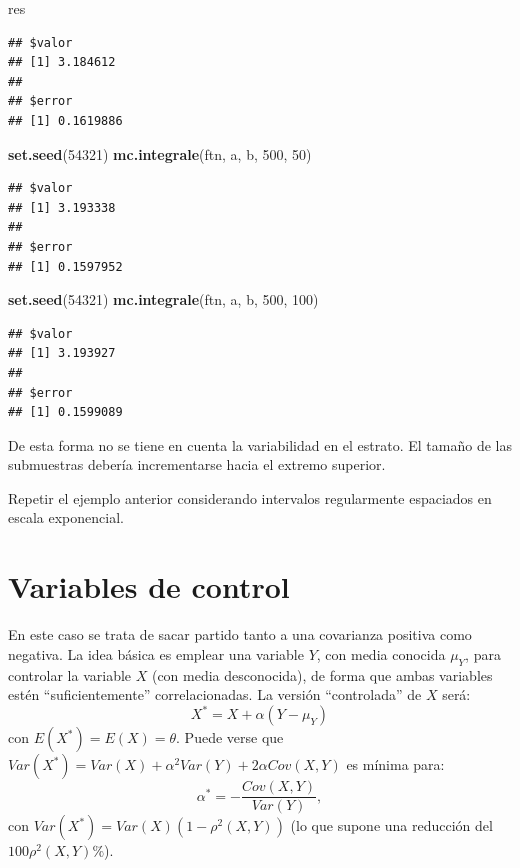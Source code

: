 \documentclass[
]{book}
\newenvironment{Shaded}{\begin{snugshade}}{\end{snugshade}}
\newcommand{\DecValTok}[1]{\textcolor[rgb]{0.00,0.00,0.81}{#1}}
\newcommand{\KeywordTok}[1]{\textcolor[rgb]{0.13,0.29,0.53}{\textbf{#1}}}
\newcommand{\NormalTok}[1]{#1}
\theoremstyle{break}
\theoremstyle{definition}
\theoremstyle{definition}
\theoremstyle{definition}
\theoremstyle{remark}
\let\BeginKnitrBlock\begin \let\EndKnitrBlock\end
\begin{document}
\begin{Shaded}
\begin{Highlighting}[]
\NormalTok{res}
\end{Highlighting}
\end{Shaded}

\begin{verbatim}
## $valor
## [1] 3.184612
## 
## $error
## [1] 0.1619886
\end{verbatim}

\begin{Shaded}
\begin{Highlighting}[]
\KeywordTok{set.seed}\NormalTok{(}\DecValTok{54321}\NormalTok{)}
\KeywordTok{mc.integrale}\NormalTok{(ftn, a, b, }\DecValTok{500}\NormalTok{, }\DecValTok{50}\NormalTok{)}
\end{Highlighting}
\end{Shaded}

\begin{verbatim}
## $valor
## [1] 3.193338
## 
## $error
## [1] 0.1597952
\end{verbatim}

\begin{Shaded}
\begin{Highlighting}[]
\KeywordTok{set.seed}\NormalTok{(}\DecValTok{54321}\NormalTok{)}
\KeywordTok{mc.integrale}\NormalTok{(ftn, a, b, }\DecValTok{500}\NormalTok{, }\DecValTok{100}\NormalTok{)}
\end{Highlighting}
\end{Shaded}

\begin{verbatim}
## $valor
## [1] 3.193927
## 
## $error
## [1] 0.1599089
\end{verbatim}

De esta forma no se tiene en cuenta la variabilidad en el estrato.
El tamaño de las submuestras debería incrementarse hacia el extremo superior.

\BeginKnitrBlock{exercise}
\protect\hypertarget{exr:mc-integraleb}{}{\label{exr:mc-integraleb} }
\EndKnitrBlock{exercise}

Repetir el ejemplo anterior considerando intervalos regularmente espaciados en escala exponencial.

\hypertarget{variables-de-control}{%
\section{Variables de control}\label{variables-de-control}}

En este caso se trata de sacar partido tanto a una covarianza
positiva como negativa.
La idea básica es emplear una variable \(Y\), con media conocida
\(\mu_{Y}\), para controlar la variable \(X\) (con media desconocida),
de forma que ambas variables estén ``suficientemente'' correlacionadas.
La versión ``controlada'' de \(X\) será:
\[X^{\ast}=X+\alpha \left(  Y-\mu_{Y}\right)\]
con \(E(X^{\ast})=E(X)=\theta\).
Puede verse que
\(Var(X^{\ast})=Var(X)+\alpha^{2}Var(Y)+2\alpha Cov(X,Y)\)
es mínima para:
\[\alpha^{\ast}=-\frac{Cov(X,Y)}{Var(Y)},\]
con \(Var(X^{\ast}) = Var(X) \left( 1-\rho^{2} \left( X, Y \right) \right)\)
(lo que supone una reducción del \(100\rho^{2}\left( X, Y \right) \%\)).
\end{document}
